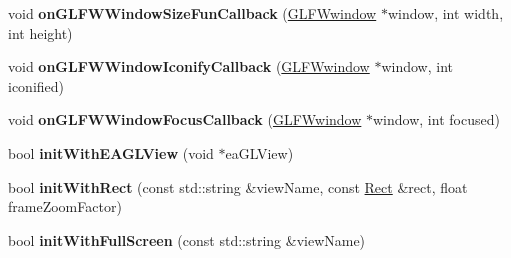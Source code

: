 \begin{DoxyCompactItemize}
void {\bfseries on\+G\+L\+F\+W\+Window\+Size\+Fun\+Callback} (\hyperlink{group__window_ga3c96d80d363e67d13a41b5d1821f3242}{G\+L\+F\+Wwindow} $\ast$window, int width, int height)
\item 
\mbox{\label{classGLViewImpl_a502c5bae33a42f3beb8e97547f38dbe0}} 
void {\bfseries on\+G\+L\+F\+W\+Window\+Iconify\+Callback} (\hyperlink{group__window_ga3c96d80d363e67d13a41b5d1821f3242}{G\+L\+F\+Wwindow} $\ast$window, int iconified)
\item 
\mbox{\label{classGLViewImpl_a687531021bf932108d36d1989a575196}} 
void {\bfseries on\+G\+L\+F\+W\+Window\+Focus\+Callback} (\hyperlink{group__window_ga3c96d80d363e67d13a41b5d1821f3242}{G\+L\+F\+Wwindow} $\ast$window, int focused)
\item 
\mbox{\label{classGLViewImpl_acde8c4c6f7f34228b429639cfe0270b9}} 
bool {\bfseries init\+With\+E\+A\+G\+L\+View} (void $\ast$ea\+G\+L\+View)
\item 
\mbox{\label{classGLViewImpl_ac1cf3cfb00c12fc26f82179325b5613f}} 
bool {\bfseries init\+With\+Rect} (const std\+::string \&view\+Name, const \hyperlink{classRect}{Rect} \&rect, float frame\+Zoom\+Factor)
\item 
\mbox{\label{classGLViewImpl_a2815df489e15eeb1e75d96398ff71c9c}} 
bool {\bfseries init\+With\+Full\+Screen} (const std\+::string \&view\+Name)
\end{DoxyCompactItemize}

